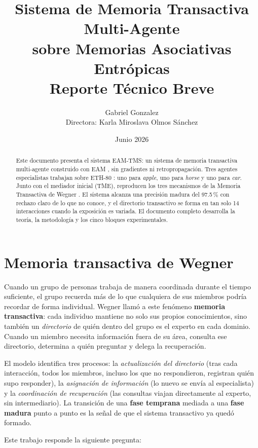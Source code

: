 \documentclass[11pt]{article}
\title{%
    \textbf{Sistema de Memoria Transactiva Multi-Agente}\\
    \textbf{sobre Memorias Asociativas Entrópicas}\\[0.4em]
    \large Reporte Técnico Breve
}
\author{Gabriel Gonzalez\\[0.3em]
\small Directora: Karla Miroslava Olmos Sánchez}
\date{Junio 2026}
\begin{document}
\maketitle

\begin{abstract}
Este documento presenta el sistema EAM-TMS: un sistema de memoria transactiva
multi-agente construido con EAM \cite{pineda2021entropic,pineda2024hetero},
sin gradientes ni retropropagación.
Tres agentes especialistas trabajan sobre ETH-80 \cite{leibe2003eth80}: uno
para \textit{apple}, uno para \textit{horse} y uno para \textit{car}.
Junto con el mediador inicial (TME), reproducen los tres mecanismos de la
Memoria Transactiva de Wegner \cite{wegner1987transactive}.
El sistema alcanza una precisión madura del 97.5\,\% con rechazo claro de lo
que no conoce, y el directorio transactivo se forma en tan solo 14 interacciones
cuando la exposición es variada.
El documento completo desarrolla la teoría, la metodología y los cinco bloques
experimentales.
\end{abstract}

\section{Memoria transactiva de Wegner}

Cuando un grupo de personas trabaja de manera coordinada durante el tiempo
suficiente, el grupo recuerda más de lo que cualquiera de sus miembros podría
recordar de forma individual.
Wegner \cite{wegner1987transactive} llamó a este fenómeno \textbf{memoria
transactiva}: cada individuo mantiene no solo sus propios conocimientos, sino
también un \emph{directorio} de quién dentro del grupo es el experto en cada
dominio.
Cuando un miembro necesita información fuera de su área, consulta ese
directorio, determina a quién preguntar y delega la recuperación.

El modelo identifica tres procesos: la \emph{actualización del directorio}
(tras cada interacción, todos los miembros, incluso los que no respondieron,
registran quién supo responder), la \emph{asignación de información} (lo nuevo
se envía al especialista) y la \emph{coordinación de recuperación} (las
consultas viajan directamente al experto, sin intermediario).
La transición de una \textbf{fase temprana} mediada a una \textbf{fase madura}
punto a punto es la señal de que el sistema transactivo ya quedó formado.

Este trabajo responde la siguiente pregunta:
\end{document}
